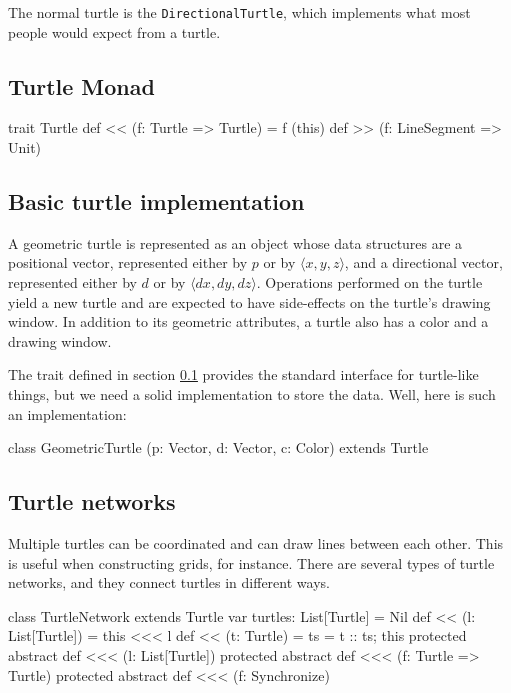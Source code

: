 \documentclass{article}
\begin{document}
      The normal turtle is the {\tt DirectionalTurtle}, which implements what most people would expect from a turtle.

    \subsection{Turtle Monad}
      \label{sec:turtle-monad}

      \begin{scalacode}
trait Turtle {
  def << (f: Turtle => Turtle) = f (this)
  def >> (f: LineSegment => Unit)
}
      \end{scalacode}

    \subsection{Basic turtle implementation}
      \label{sec:basic-turtle-implementation}

      A geometric turtle is represented as an object whose data structures are a positional vector, represented either by $p$ or by $\langle x, y, z \rangle$,
      and a directional vector, represented either by $d$ or by $\langle dx, dy, dz \rangle$. Operations performed on the turtle yield a new turtle and are
      expected to have side-effects on the turtle's drawing window. In addition to its geometric attributes, a turtle also has a color and a drawing window.


      The trait defined in section \ref{sec:turtle-monad} provides the standard interface for turtle-like things, but we need a solid implementation to store
      the data. Well, here is such an implementation:

      \begin{scalacode}
class GeometricTurtle (p: Vector, d: Vector, c: Color) extends Turtle {
  
}
      \end{scalacode}

    \subsection{Turtle networks}
      \label{sec:turtle-networks}

      Multiple turtles can be coordinated and can draw lines between each other. This is useful when constructing grids, for instance. There are several types
      of turtle networks, and they connect turtles in different ways.

      \begin{scalacode}
class TurtleNetwork extends Turtle {
  var turtles: List[Turtle] = Nil
  def << (l: List[Turtle]) = {this <<< l}
  def << (t: Turtle) = {ts = t :: ts; this}
  protected abstract def <<< (l: List[Turtle])
  protected abstract def <<< (f: Turtle => Turtle)
  protected abstract def <<< (f: Synchronize)
}
      \end{scalacode}
\end{document}
